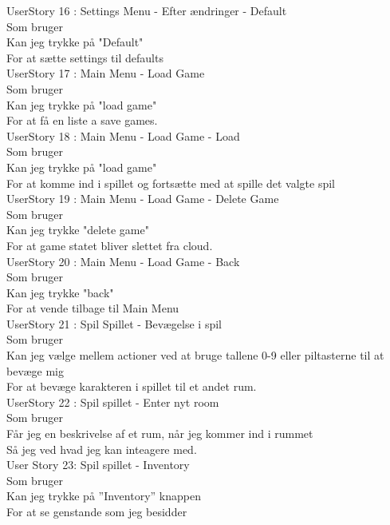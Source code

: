 UserStory 16 : Settings Menu - Efter ændringer - Default\\
  Som bruger \\
  Kan jeg trykke på "Default" \\
  For at sætte settings til defaults\\
  
UserStory 17 : Main Menu - Load Game\\
  Som bruger \\
  Kan jeg trykke på "load game" \\
  For at få en liste a save games.\\


UserStory 18 : Main Menu - Load Game - Load\\
  Som bruger \\
  Kan jeg trykke på "load game" \\
  For at komme ind i spillet og fortsætte med at spille det valgte spil\\

UserStory 19 : Main Menu - Load Game - Delete Game\\
  Som bruger \\
  Kan jeg trykke "delete game" \\
  For at game statet bliver slettet fra cloud.\\

UserStory 20 : Main Menu - Load Game - Back\\
  Som bruger \\
  Kan jeg trykke "back" \\
  For at vende tilbage til Main Menu\\
  
UserStory 21 : Spil Spillet - Bevægelse i spil\\
  Som bruger \\
  Kan jeg vælge mellem actioner ved at bruge tallene 0-9 eller piltasterne til at bevæge mig\\
  For at bevæge karakteren i spillet til et andet rum.\\

UserStory 22 : Spil spillet - Enter nyt room\\
  Som bruger \\
  Får jeg en beskrivelse af et rum, når jeg kommer ind i rummet\\
  Så jeg ved hvad jeg kan inteagere med.\\

User Story 23: Spil spillet - Inventory\\
Som bruger\\
Kan jeg trykke på ”Inventory” knappen\\
For at se genstande som jeg besidder\\
  
